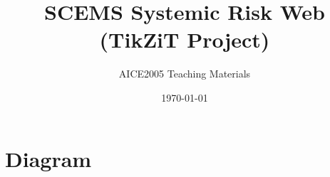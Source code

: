 \documentclass[a4paper,11pt]{article}
\title{SCEMS Systemic Risk Web (TikZiT Project)}
\author{AICE2005 Teaching Materials}
\date{\today}
\begin{document}
\maketitle

\section*{Diagram}
\begin{center}

\end{center}
\end{document}
